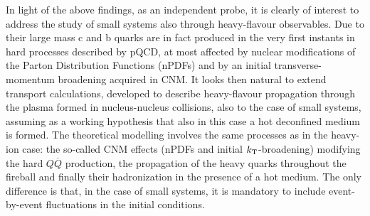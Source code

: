 In light of the above findings, as an independent probe, it is clearly of interest to address the study of small systems also through heavy-flavour observables. Due to their large mass c and b quarks are in fact produced in the very first instants in hard processes described by pQCD, at most affected by nuclear modifications of the Parton Distribution Functions (nPDFs) and by an initial transverse-momentum broadening acquired in CNM. %
It looks then natural to extend transport calculations, developed to describe heavy-flavour propagation through the plasma formed in nucleus-nucleus collisions, also to the case of small systems, assuming as a working hypothesis that also in this case a hot deconfined medium is formed. The theoretical modelling involves the same processes as in the heavy-ion case: the so-called CNM effects (nPDFs and initial $k_{\rm T}$-broadening) modifying the hard $Q\overline{Q}$ production, the propagation of the heavy quarks throughout the fireball and finally their hadronization in the presence of a hot medium. The only difference is that, in the case of small systems, it is mandatory to include event-by-event fluctuations in the initial conditions.



